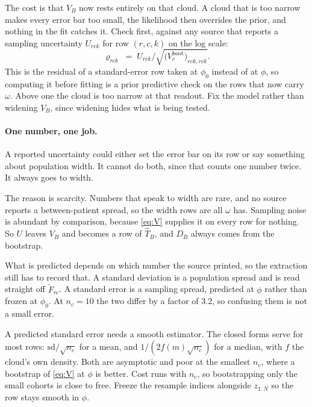 \documentclass[11pt]{article}
\begin{document}
The cost is that $V_B$ now rests entirely on that cloud. A cloud that is too
narrow makes every error bar too small, the likelihood then overrides the prior,
and nothing in the fit catches it. Check first, against any source that reports a
sampling uncertainty $U_{rck}$ for row $(r,c,k)$ on the log scale:
\begin{equation}
\varrho_{rck} \;=\; U_{rck}\Big/\sqrt{\big(V^{\text{boot}}_c\big)_{rck,rck}} .
\label{eq:ratio}
\end{equation}
This is the residual of a standard-error row taken at $\phi_0$ instead of at
$\phi$, so computing it before fitting is a prior predictive check on the rows
that now carry $\omega$. Above one the cloud is too narrow at that readout. Fix
the model rather than widening $V_B$, since widening hides what is being tested.

\paragraph{One number, one job.} A reported uncertainty could either set the
error bar on its row or say something about population width. It cannot do both,
since that counts one number twice. It always goes to width.

The reason is scarcity. Numbers that speak to width are rare, and no source
reports a between-patient spread, so the width rows are all $\omega$ has. Sampling noise is abundant by
comparison, because \eqref{eq:V} supplies it on every row for nothing. So $U$
leaves $V_B$ and becomes a row of $\widehat T_B$, and $D_B$ always comes from the
bootstrap.

What is predicted depends on which number the source printed, so the extraction
still has to record that. A standard deviation is a population spread and is read
straight off $\tilde F_{rc}$. A standard error is a sampling spread, predicted at
$\phi$ rather than frozen at $\phi_0$. At $n_c=10$ the two differ by a factor of
$3.2$, so confusing them is not a small error.

A predicted standard error needs a smooth estimator. The closed forms serve for
most rows: $\mathrm{sd}/\sqrt{n_c}$ for a mean, and $1/(2f(m)\sqrt{n_c})$ for a
median, with $f$ the cloud's own density. Both are asymptotic and poor at the
smallest $n_c$, where a bootstrap of \eqref{eq:V} at $\phi$ is better. Cost runs
with $n_c$, so bootstrapping only the small cohorts is close to free. Freeze the
resample indices alongside $z_{1:N}$ so the row stays smooth in $\phi$.
\end{document}
